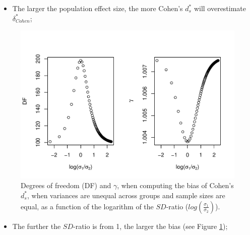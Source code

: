 \documentclass[
  english,
  man]{apa6}
\providecommand{\tightlist}{%
  \setlength{\itemsep}{0pt}\setlength{\parskip}{0pt}}
\begin{document}
\begin{itemize}
\tightlist
\item
  The larger the population effect size, the more Cohen's \(d^*_s\) will overestimate \(\delta^*_{Cohen}\);
\end{itemize}

\begin{figure}
\centering
\includegraphics{Theoretical-Bias-of-all-estimators-as-a-function-of-population-parameters_files/figure-latex/biascohendprimehetbalSDratio2-1.pdf}
\caption{\label{fig:biascohendprimehetbalSDratio2}Degrees of freedom (DF) and \(\gamma\), when computing the bias of Cohen's \(d^*_s\), when variances are unequal across groups and sample sizes are equal, as a function of the logarithm of the \(SD\)-ratio (\(log \left( \frac{\sigma_1}{\sigma_2} \right)\)).}
\end{figure}

\begin{itemize}
\tightlist
\item
  The further the \(SD\)-ratio is from 1, the larger the bias (see Figure \ref{fig:biascohendprimehetbalSDratio2});
\end{itemize}
\end{document}
